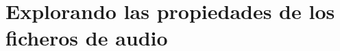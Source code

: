 \documentclass[es,practica]{uah}
\begin{document}
%
%
%
%
%

\section{Explorando las propiedades de los ficheros de audio}
\end{document}
